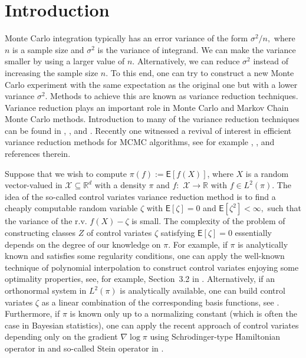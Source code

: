 \documentclass[preprint]{imsart}
\begin{document}
\section{Introduction}

Monte Carlo integration typically has an error variance of the form
$\sigma^{2}/n,$ where $n$ is a sample size and \(\sigma^2\) is the variance of  integrand. We can make the variance smaller
by using a larger value of $n$.  Alternatively,
 we can  reduce $\sigma^2$ instead of increasing the sample size \(n\). To this end, one can try to construct
a new Monte Carlo experiment with the same expectation as the original one
but with a lower variance $\sigma^2$. Methods to achieve this are known as variance
reduction techniques. Variance reduction plays an important role in
Monte Carlo and Markov Chain Monte Carlo methods. Introduction to many of the variance reduction techniques can be found in \cite{christian1999monte}, \cite{rubinstein2016simulation}, \cite{GobetBook} and \cite{glasserman2013monte}. Recently one witnessed a revival of interest in efficient variance reduction methods  for MCMC algorithms, see for example \cite{dellaportas2012control}, \cite{mira2013zero}, \cite{brosse2018diffusion} and references therein.
\par
Suppose that we wish to compute $\pi(f):=\mathsf{E}\left[f(X)\right]$, where $X$
is a random vector-valued in $\mathcal{X}\subseteq\mathbb{R}^{d}$ with a density $\pi$ and $f:$
$\mathcal{X}\to\mathbb{R}$ with $f\in L^2(\pi)$.
The idea of the so-called control variates variance reduction method
 is to find a cheaply computable random variable $\zeta$ with $\mathsf{E}[\zeta]=0$ and \(\mathsf{E}[\zeta^2]<\infty,\)
such that the variance of the r.v. $f(X)-\zeta$ is small.  The complexity of the problem of constructing classes $Z$ of control variates \(\zeta\) satisfying   $\mathsf{E}[\zeta]=0$ essentially depends on the degree of our knowledge on \(\pi.\)
For example, if \(\pi\) is analytically known and satisfies some regularity conditions, one can apply the well-known technique of  polynomial interpolation to construct control variates enjoying  some optimality properties, see, for example, Section~3.2 in \cite{dimov2008monte}. Alternatively, if an orthonormal system in \(L^2(\pi)\) is analytically available, one can build control variates \(\zeta\) as a linear combination of the corresponding basis functions, see \cite{GobetCV}. Furthermore, if \(\pi\) is known only up to a normalizing constant (which is often the case in Bayesian statistics), one can apply the recent approach of control variates  depending only on the gradient \(\nabla \log \pi\)  using Schr\(\ddot{\text{o}}\)dinger-type Hamiltonian operator in  \cite{mira2013zero} and so-called Stein operator in \cite{brosse2018diffusion}.
\end{document}
